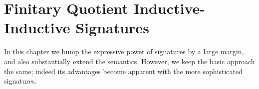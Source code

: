\documentclass[12pt,a4paper,twoside,openany]{book}
\theoremstyle{remark}
\theoremstyle{definition}
\theoremstyle{theorem}
\newcommand{\ms}[1]{\mathsf{#1}}
\newcommand{\blank}{\mathord{\hspace{1pt}\text{--}\hspace{1pt}}}
\begin{document}





\chapter[Finitary QII Signatures]{Finitary Quotient Inductive-Inductive Signatures}
\label{chap:fqiit}

In this chapter we bump the expressive power of signatures by a large margin,
and also substantially extend the semantics. However, we keep the basic approach
the same; indeed its advantages become apparent with the more sophisticated
signatures.
\end{document}
